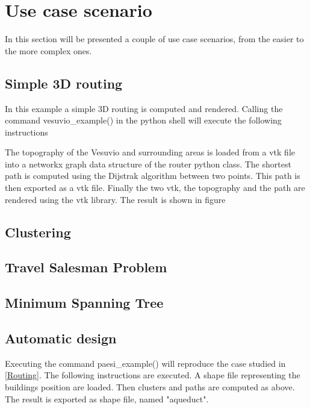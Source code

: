 \chapter{Use case scenario}
\label{appendiceE}
\thispagestyle{empty}

\noindent In this section will be presented a couple of use case scenarios, from the easier to the more complex ones.

\section{Simple 3D routing}
In this example a simple 3D routing is computed and rendered. Calling the command vesuvio_example() in the python shell will execute the following instructions 


The topography of the Vesuvio and surrounding areas is loaded from a vtk file into a networkx graph data structure of the router python class. The shortest path is computed using the Dijstrak algorithm between two points. This path is then exported as a vtk file. Finally the two vtk, the topography and the path are rendered using the vtk library. The result is shown in figure 

\section{Clustering}
\section{Travel Salesman Problem}
\section{Minimum Spanning Tree}

\section{Automatic design}
Executing the command paesi_example() will reproduce the case studied in \ref{Routing}. The following instructions are executed. A shape file representing the buildings position  are loaded. Then clusters and paths are computed as above. The result is exported as shape file, named "aqueduct".